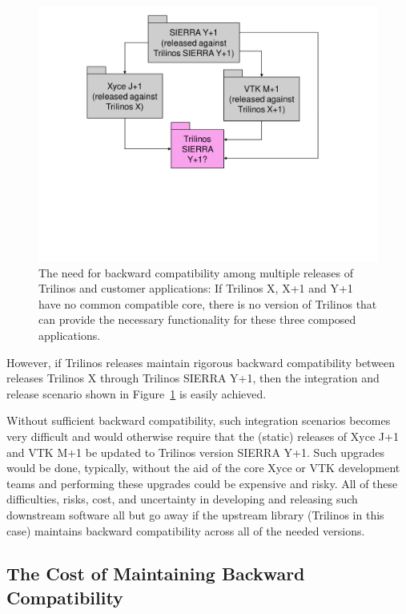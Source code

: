 \documentclass[11pt]{SANDreport}
\begin{document}
\begin{figure}
\begin{center}
\includegraphics[trim = 1.0in 2.7in 1.0in 0.2in, scale=0.55]
{XyceSierraVtkTrilinosCompatibility}
\caption{
The need for backward compatibility among multiple releases of
Trilinos and customer applications: If Trilinos X, X+1 and Y+1 have no
common compatible core, there is no version of Trilinos that can
provide the necessary functionality for these three composed
applications.}
\label{fig:XyceSierraVtkTrilinosCompatibility}
\end{center}
\end{figure}

However, if Trilinos releases maintain rigorous backward compatibility
between releases Trilinos X through Trilinos SIERRA Y+1, then the
integration and release scenario shown in
Figure~\ref{fig:XyceSierraVtkTrilinosCompatibility} is easily
achieved.

Without sufficient backward compatibility, such integration scenarios
becomes very difficult and would otherwise require that the (static)
releases of Xyce J+1 and VTK M+1 be updated to Trilinos version SIERRA
Y+1.  Such upgrades would be done, typically, without the aid of the
core Xyce or VTK development teams and performing these upgrades could
be expensive and risky.  All of these difficulties, risks, cost, and
uncertainty in developing and releasing such downstream software all
but go away if the upstream library (Trilinos in this case) maintains
backward compatibility across all of the needed versions.


%
{}\subsection{The Cost of Maintaining Backward Compatibility}
\label{sec:costs_of_back_compat}
%
\end{document}
